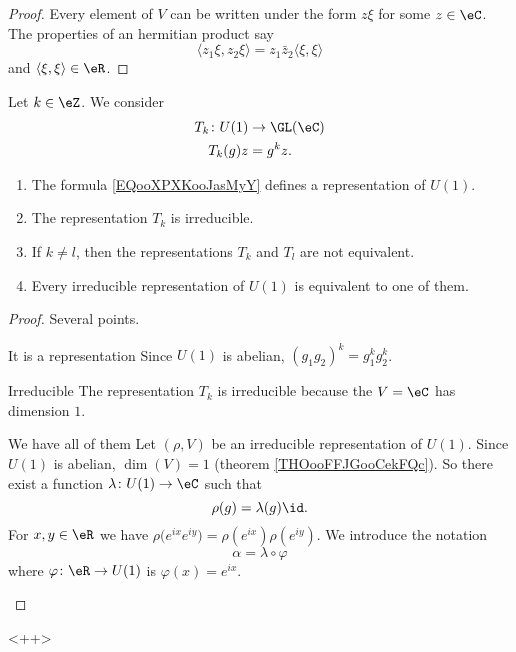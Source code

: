\begin{proof}
    Every element of \( V\) can be written under the form \( z\xi\) for some \( z\in \eC\). The properties of an hermitian product say
    \begin{equation}
        \langle z_1\xi, z_2\xi\rangle =z_1\bar z_2\langle \xi, \xi\rangle 
    \end{equation}
    and \( \langle \xi, \xi\rangle \in \eR\).
\end{proof}

\begin{proposition}       \label{PROPooLWWEooUmqbRA}
    Let \( k\in \eZ\). We consider
    \begin{equation}        \label{EQooXPXKooJasMyY}
        \begin{aligned}
            T_k\colon U(1)&\to \GL(\eC) \\
            T_k(g)z&=g^kz.
        \end{aligned}
    \end{equation}
    \begin{enumerate}
        \item
            The formula \eqref{EQooXPXKooJasMyY} defines a representation of \( U(1)\).
        \item
            The representation \( T_k\) is irreducible.
        \item
            If \( k\neq l\), then the representations \( T_k\) and \( T_l\) are not equivalent.
        \item
            Every irreducible representation of \( U(1)\) is equivalent to one of them.
    \end{enumerate}
\end{proposition}

\begin{proof}
    Several points.
    \begin{subproof}
        \item[It is a representation]
            Since \( U(1)\) is abelian, \( (g_1g_2)^k=g_1^kg_2^k\).
        \item[Irreducible]
            The representation \( T_k\) is irreducible because the \( V=\eC\) has dimension \( 1\).
        \item[We have all of them]
            Let \( (\rho, V)\) be an irreducible representation of \( U(1)\). Since \( U(1)\) is abelian, \( \dim(V)=1\) (theorem \ref{THOooFFJGooCekFQc}). So there exist a function \( \lambda\colon U(1)\to \eC\) such that 
            \begin{equation}
                \rho(g)=\lambda(g)\id.
            \end{equation}
            For \( x,y\in \eR\) we have \( \rho\big(  e^{ix} e^{iy} \big)=\rho( e^{ix})\rho( e^{iy})\). We introduce the notation
            \begin{equation}
                \alpha=\lambda\circ\varphi
            \end{equation}
            where \( \varphi\colon \eR\to U(1)\) is \( \varphi(x)= e^{ix}\).
    \end{subproof}
\end{proof}
<++>
